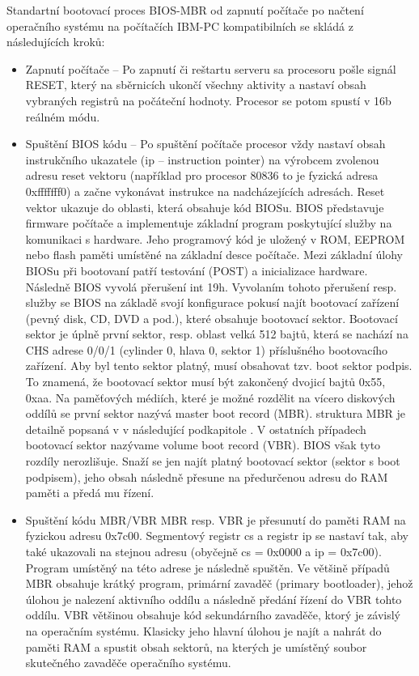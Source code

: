 \documentclass[thesis=B,czech]{FITthesis}[2012/06/26]
\begin{document}
Standartní bootovací proces BIOS-MBR od zapnutí počítače po načtení operačního systému na počítačích IBM-PC kompatibilních se skládá z následujících kroků:
\begin{itemize}

\item Zapnutí počítače -- Po zapnutí či reštartu serveru sa procesoru pošle signál RESET,
 který na sběrnicích ukončí všechny aktivity a nastaví obsah vybraných registrů na počáteční hodnoty. Procesor se potom spustí v 16b reálném módu.
\item Spuštění BIOS kódu -- Po spuštění počítače procesor vždy nastaví obsah instrukčního ukazatele (ip – instruction pointer) na výrobcem zvolenou adresu reset vektoru
(například pro procesor 80836 to je fyzická adresa 0xfffffff0) a začne vykonávat instrukce na nadcházejících adresách. Reset vektor ukazuje do oblasti, která obsahuje kód BIOSu. BIOS představuje firmware počítače a implementuje základní program poskytující služby na komunikaci s hardware. Jeho programový kód je uložený v ROM, EEPROM nebo flash paměti umístěné na základní desce počítače. Mezi základní úlohy BIOSu při bootovaní patří testování (POST) a inicializace hardware. Následně BIOS vyvolá přerušení int 19h.
Vyvolaním tohoto přerušení resp. služby se BIOS na základě svojí konfigurace pokusí najít bootovací zařízení (pevný disk, CD, DVD a pod.), které obsahuje bootovací sektor. Bootovací sektor je úplně první sektor, resp. oblast velká 512 bajtů, která se nachází na CHS adrese 0/0/1 (cylinder 0, hlava 0, sektor 1) příslušného bootovacího zařízení. Aby byl tento sektor platný, musí obsahovat tzv. boot sektor podpis. To
znamená, že bootovací sektor musí být zakončený dvojicí bajtů 0x55,
0xaa.
Na paměťových médiích, které je možné rozdělit na vícero diskových
oddílů se první sektor nazývá master boot record (MBR). struktura
MBR je detailně popsaná v v následující podkapitole . V ostatních případech
bootovací sektor nazývame volume boot record (VBR). BIOS však tyto
rozdíly nerozlišuje. Snaží se jen najít platný bootovací sektor (sektor
s boot podpisem), jeho obsah následně přesune na předurčenou adresu
do RAM paměti a předá mu řízení.
\item Spuštění kódu MBR/VBR MBR resp. VBR je přesunutí do paměti RAM na fyzickou adresu 0x7c00.
Segmentový registr cs a registr ip se nastaví tak, aby také ukazovali
na stejnou adresu (obyčejně cs = 0x0000 a ip = 0x7c00). Program
umístěný na této adrese je následně spuštěn. Ve většině případů
MBR obsahuje krátký program, primární zavaděč (primary bootloader),
jehož úlohou je nalezení aktivního oddílu a následně předání
řízení do VBR tohto oddílu. VBR většinou obsahuje kód sekundárního zavaděče, ktorý je závislý na operačním systému. Klasicky jeho
hlavní úlohou je najít a nahrát do paměti RAM a spustit obsah sektorů,
na kterých je umístěný soubor skutečného zavaděče operačního
systému.
\end{itemize}
\end{document}
